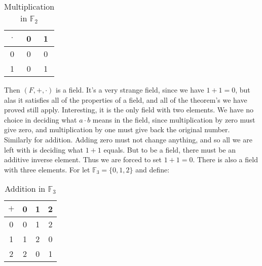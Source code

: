 \documentclass[crop=false,class=book,oneside]{standalone}
\begin{document}
            \hfill
            \begin{minipage}[b]{0.49\textwidth}
                \begin{table}[H]
                    \centering
                    \captionsetup{type=table}
                    \begin{tabular}{c|cc}
                        $\cdot$&0&1\\
                        \hline
                        0&0&0\\
                        1&0&1
                    \end{tabular}
                    \caption{Multiplication in $\mathbb{F}_{2}$}
                    \label{tab:Real_Analysis_Mult_in_F_2_Field}
                \end{table}
            \end{minipage}
            Then $(F,+,\cdot)$ is a field. It's a very strange field,
            since we have $1+1=0$, but alas it satisfies all of the
            properties of a field, and all of the theorem's we have
            proved still apply. Interesting, it is the only field
            with two elements. We have no choice in deciding what
            $a\cdot{b}$ means in the field, since multiplication by
            zero must give zero, and multiplication by one must give
            back the original number. Similarly for addition.
            Adding zero must not change anything, and so all
            we are left with is deciding what $1+1$ equals. But
            to be a field, there must be an additive inverse
            element. Thus we are forced to set $1+1=0$. There is
            also a field with three elements. For let
            $\mathbb{F}_{3}=\{0,1,2\}$ and define:
            \par\hfill\par
            \begin{minipage}[b]{0.49\textwidth}
                \centering
                \begin{table}[H]
                    \centering
                    \captionsetup{type=table}
                    \begin{tabular}{c|ccc}
                        $+$&0&1&2\\
                        \hline
                        0&0&1&2\\
                        1&1&2&0\\
                        2&2&0&1
                    \end{tabular}
                    \caption{Addition in $\mathbb{F}_{3}$}
                    \label{tab:Real_Analysis_Add_in_F_3_Field}
                \end{table}
            \end{minipage}
\end{document}
